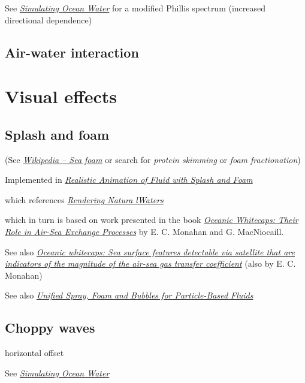 See \textit{\href{http://graphics.ucsd.edu/courses/rendering/2005/jdewall/tessendorf.pdf}{Simulating Ocean Water}} for a modified Phillis spectrum (increased directional dependence)

\subsection{Air-water interaction}

\section{Visual effects}

\subsection{Splash and foam}

(See \textit{\href{http://en.wikipedia.org/wiki/Sea_foam}{Wikipedia -- Sea foam}} or search for \textit{protein skimming} or \textit{foam fractionation})

Implemented in \textit{\href{http://nguyendangbinh.org/Proceedings/Eurographics/2003/cgf/volume22/issue3/paper127/paper127.pdf}{Realistic Animation of Fluid with Splash and Foam}}

which references \textit{\href{http://citeseerx.ist.psu.edu/viewdoc/download?doi=10.1.1.4.6262&rep=rep1&type=pdf}{Rendering Natura lWaters}}

which in turn is based on work presented in the book \textit{\href{http://books.google.se/books?id=xuwFz1bPTHgC}{Oceanic Whitecaps: Their Role in Air-Sea Exchange Processes}} by E. C. Monahan and G. MacNiocaill.

See also \textit{\href{http://www.ias.ac.in/jess/sep2002/Ps18.pdf}{Oceanic whitecaps: Sea surface features detectable via satellite that are indicators of the magnitude of the air-sea gas transfer coefficient}} (also by  E. C. Monahan)

See also \textit{\href{http://cg.informatik.uni-freiburg.de/publications/2012_CGI_sprayFoamBubbles.pdf}{Unified Spray, Foam and Bubbles for Particle-Based Fluids}}

\subsection{Choppy waves}

horizontal offset

See \textit{\href{http://graphics.ucsd.edu/courses/rendering/2005/jdewall/tessendorf.pdf}{Simulating Ocean Water}}


